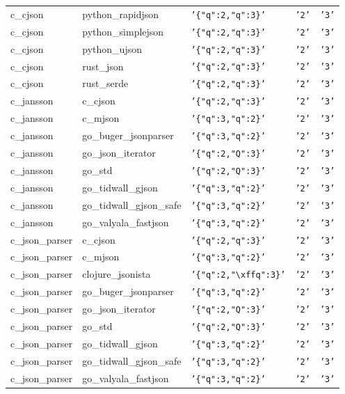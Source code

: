 \documentclass[english, 12pt, a4paper, sci, utf8, a-2b, online]{aaltothesis}
\def\str#1{\texttt{'#1'}}
\begin{document}
\begin{longtable}{lllll}
    c\_cjson & python\_rapidjson & \str{\{"q":2,"q":3\}} & \str{2} & \str{3} \\
    c\_cjson & python\_simplejson & \str{\{"q":2,"q":3\}} & \str{2} & \str{3} \\
    c\_cjson & python\_ujson & \str{\{"q":2,"q":3\}} & \str{2} & \str{3} \\
    c\_cjson & rust\_json & \str{\{"q":2,"q":3\}} & \str{2} & \str{3} \\
    c\_cjson & rust\_serde & \str{\{"q":2,"q":3\}} & \str{2} & \str{3} \\
    c\_jansson & c\_cjson & \str{\{"q":2,"q":3\}} & \str{2} & \str{3} \\
    c\_jansson & c\_mjson & \str{\{"q":3,"q":2\}} & \str{2} & \str{3} \\
    c\_jansson & go\_buger\_jsonparser & \str{\{"q":3,"q":2\}} & \str{2} & \str{3} \\
    c\_jansson & go\_json\_iterator & \str{\{"q":2,"Q":3\}} & \str{2} & \str{3} \\
    c\_jansson & go\_std & \str{\{"q":2,"Q":3\}} & \str{2} & \str{3} \\
    c\_jansson & go\_tidwall\_gjson & \str{\{"q":3,"q":2\}} & \str{2} & \str{3} \\
    c\_jansson & go\_tidwall\_gjson\_safe & \str{\{"q":3,"q":2\}} & \str{2} & \str{3} \\
    c\_jansson & go\_valyala\_fastjson & \str{\{"q":3,"q":2\}} & \str{2} & \str{3} \\
    c\_json\_parser & c\_cjson & \str{\{"q":2,"q":3\}} & \str{2} & \str{3} \\
    c\_json\_parser & c\_mjson & \str{\{"q":3,"q":2\}} & \str{2} & \str{3} \\
    c\_json\_parser & clojure\_jsonista & \str{\{"q":2,"\textbackslash xffq":3\}} & \str{2} & \str{3} \\
    c\_json\_parser & go\_buger\_jsonparser & \str{\{"q":3,"q":2\}} & \str{2} & \str{3} \\
    c\_json\_parser & go\_json\_iterator & \str{\{"q":2,"Q":3\}} & \str{2} & \str{3} \\
    c\_json\_parser & go\_std & \str{\{"q":2,"Q":3\}} & \str{2} & \str{3} \\
    c\_json\_parser & go\_tidwall\_gjson & \str{\{"q":3,"q":2\}} & \str{2} & \str{3} \\
    c\_json\_parser & go\_tidwall\_gjson\_safe & \str{\{"q":3,"q":2\}} & \str{2} & \str{3} \\
    c\_json\_parser & go\_valyala\_fastjson & \str{\{"q":3,"q":2\}} & \str{2} & \str{3} \\

\end{longtable}
\end{document}
